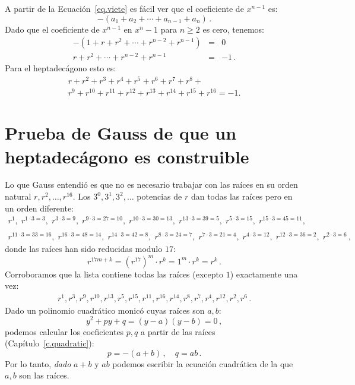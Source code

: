 A partir de la Ecuación~\ref{eq.viete} es fácil ver que el coeficiente de $x^{n-1}$ es:
\[
-(a_1+a_2+\cdots+a_{n-1}+a_n)\,.
\]
Dado que el coeficiente de $x^{n-1}$ en $x^n-1$ para $n\geq 2$ es cero, tenemos:
\begin{eqnarray*}
-(1+r+r^2+\cdots + r^{n-2}+r^{n-1})&=&0\\
r+r^2+\cdots + r^{n-2}+r^{n-1}&=&-1\,.
\end{eqnarray*}
Para el heptadecágono esto es:
\begin{multline}
r+r^2+r^3+r^4+r^5+r^6+r^7+r^8+\\
r^9+r^{10}+r^{11}+r^{12}+r^{13}+r^{14} + r^{15}+r^{16}=-1.\label{eq.minus-one}
\end{multline}

\section{Prueba de Gauss de que un heptadecágono es construible}\label{s.gauss}

Lo que Gauss entendió es que no es necesario trabajar con las raíces en su orden natural $r,r^2,\ldots,r^{16}$. Los $3^0, 3^1, 3^2, \ldots$ potencias de $r$ dan todas las raíces pero en un orden diferente:
\[
\begin{array}{l}
r^1, \;r^{1\cdot 3 =3},\; r^{3\cdot 3=9},\; r^{9\cdot 3=27=10},\; r^{10\cdot 3=30=13},\; r^{13\cdot 3=39=5},\; r^{5\cdot 3=15},\; r^{15\cdot 3=45=11},\\\\
r^{11\cdot 3 =33=16}, \;r^{16\cdot 3=48=14},\; r^{14\cdot 3=42=8},\; r^{8\cdot 3=24=7},\;r^{7\cdot 3=21=4},\; r^{4\cdot 3=12},\; r^{12\cdot 3=36=2},\; r^{2\cdot 3=6}\,,
\end{array}
\]
donde las raíces han sido reducidas modulo $17$:
\[
r^{17m+k}=(r^{17})^m\cdot r^k=1^m\cdot r^k=r^k\,.
\]
Corroboramos que la lista contiene todas las raíces (excepto $1$) exactamente una vez:
\begin{align}\label{eq.roots}
r^1, r^3, r^9, r^{10}, r^{13}, r^5, r^{15}, r^{11}, r^{16}, r^{14}, r^8, r^7, r^4, r^{12}, r^2, r^6\,.
\end{align}
Dado un polinomio cuadrático monicó cuyas raíces son $a,b$:
\[
y^2+py+q=(y-a)(y-b)=0\,,
\]
podemos calcular los coeficientes $p,q$ a partir de las raíces (Capítulo~\ref{c.quadratic}):
\[
p=-(a+b)\,,\quad q=ab\,.
\]
Por lo tanto, \emph{dado} $a+b$ y $ab$ podemos escribir la ecuación cuadrática de la que $a,b$ son las raíces.


